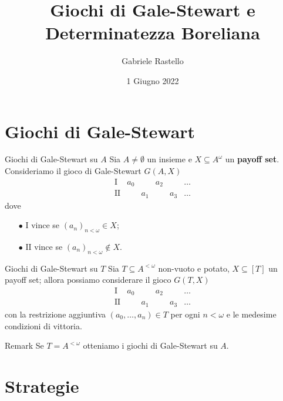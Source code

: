 \documentclass[aspectratio=43]{beamer}
\title{Giochi di Gale-Stewart e Determinatezza Boreliana}
\author{Gabriele Rastello}
\date{1 Giugno 2022}
\begin{document}
\begin{frame}
  \titlepage
\end{frame}

\section{Giochi di Gale-Stewart}

\begin{frame}{Giochi di Gale-Stewart su \(A\)}
  Sia \(A \neq \emptyset\) un insieme e \(X \subseteq A^\omega\) un \textbf{payoff set}.
  Consideriamo il gioco di Gale-Stewart \(G(A, X)\)
  \begin{equation*}
    \begin{matrix}
      \mathrm{I} & a_0 & & a_2 & & \ldots\\
      \mathrm{II} & & a_1 & & a_3 & \ldots
    \end{matrix}
  \end{equation*}
  \pause
  dove
  \begin{itemize}
  \item[\(\bullet\)] \(\mathrm{I}\) vince se \((a_n)_{n < \omega} \in X\);
  \item[\(\bullet\)] \(\mathrm{II}\) vince se \((a_n)_{n < \omega} \not\in X\).
  \end{itemize}
\end{frame}

\begin{frame}{Giochi di Gale-Stewart su \(T\)}
  Sia \(T \subseteq A^{<\omega}\) non-vuoto e potato, \(X\subseteq [T]\) un payoff set; allora possiamo considerare il gioco \(G(T, X)\)
  \begin{equation*}
    \begin{matrix}
      \mathrm{I} & a_0 & & a_2 & & \ldots\\
      \mathrm{II} & & a_1 & & a_3 & \ldots
    \end{matrix}
  \end{equation*}
  con la restrizione aggiuntiva \((a_0, \ldots, a_n) \in T\) per ogni \(n < \omega\) e le medesime condizioni di vittoria.
  \pause
  \begin{block}{Remark}
    Se \(T = A^{<\omega}\) otteniamo i giochi di Gale-Stewart su \(A\).
  \end{block}
\end{frame}

\section{Strategie}
\end{document}
